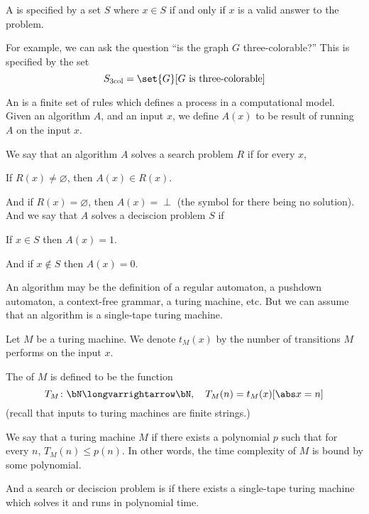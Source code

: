 \documentclass[10pt]{article}
\let\longto=\longvarrightarrow
\begin{document}
\begin{defn*}

    A  is specified by a set $S$ where $x\in S$ if and only if $x$ is a valid answer to the problem.

\end{defn*}

For example, we can ask the question ``is the graph $G$ three-colorable?''
This is specified by the set
\[ S_{3\text{col}} = \set{G}[\text{$G$ is three-colorable}] \]

\begin{defn*}

    An  is a finite set of rules which defines a process in a computational model.
    Given an algorithm $A$, and an input $x$, we define $A(x)$ to be result of running $A$ on the input $x$.

    We say that an algorithm $A$ solves a search problem $R$ if for every $x$,
    \benum
        \item If $R(x)\neq\varnothing$, then $A(x)\in R(x)$.
        \item And if $R(x)=\varnothing$, then $A(x)=\perp$ (the symbol for there being no solution).
    \eenum
    And we say that $A$ solves a deciscion problem $S$ if
    \benum
        \item If $x\in S$ then $A(x)=1$.
        \item And if $x\notin S$ then $A(x)=0$.
    \eenum

\end{defn*}

An algorithm may be the definition of a regular automaton, a pushdown automaton, a context-free grammar, a turing machine, etc.
But we can assume that an algorithm is a single-tape turing machine.

\begin{defn*}

    Let $M$ be a turing machine.
    We denote $t_M(x)$ by the number of transitions $M$ performs on the input $x$.

    The  of $M$ is defined to be the function
    \[ T_M\colon\bN\longto\bN,\quad T_M(n) = \maxof{t_M(x)}[\abs x=n] \]
    (recall that inputs to turing machines are finite strings.)

\end{defn*}

\begin{defn*}

    We say that a turing machine $M$  if there exists a polynomial $p$ such that for every $n$, $T_M(n)\leq p(n)$.
    In other words, the time complexity of $M$ is bound by some polynomial.

    And a search or deciscion problem is  if there exists a single-tape turing machine which solves it and runs in polynomial time.

\end{defn*}
\end{document}
